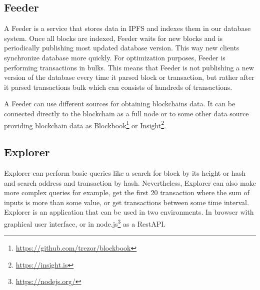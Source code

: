 \subsection{Feeder}
A Feeder is a service that stores data in IPFS and indexes them in our database system. Once all blocks are indexed, Feeder waits for new blocks and is periodically publishing most updated database version. This way new clients synchronize database more quickly. For optimization purposes, Feeder is performing transactions in bulks. This means that Feeder is not publishing a new version of the database every time it parsed block or transaction, but rather after it parsed transactions bulk which can consists of hundreds of transactions.  

A Feeder can use different sources for obtaining blockchains data. It can be connected directly to the blockchain as a full node or to some other data source providing blockchain data as Blockbook\footnote{\url{https://github.com/trezor/blockbook}} or Insight\footnote{\url{https://insight.is}}.


\subsection{Explorer}
Explorer can perform basic queries like a search for block by its height or hash and search address and transaction by hash. Nevertheless, Explorer can also make more complex queries for example, get the first 20 transaction where the sum of inputs is more than some value, or get transactions between some time interval. Explorer is an application that can be used in two environments. In browser with graphical user interface, or in node.js\footnote{\url{https://nodejs.org/}} as a RestAPI.

